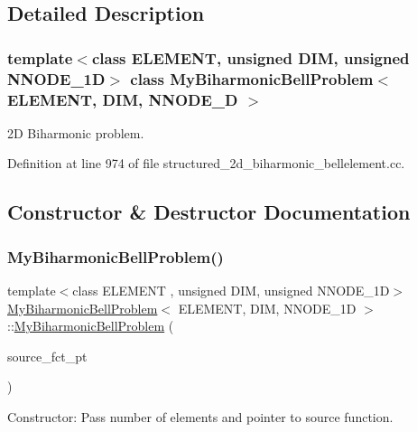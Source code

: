 \subsection{Detailed Description}
\subsubsection*{template$<$class E\+L\+E\+M\+E\+NT, unsigned D\+IM, unsigned N\+N\+O\+D\+E\+\_\+1D$>$\newline
class My\+Biharmonic\+Bell\+Problem$<$ E\+L\+E\+M\+E\+N\+T, D\+I\+M, N\+N\+O\+D\+E\+\_\+D $>$}

2D Biharmonic problem. 

Definition at line 974 of file structured\+\_\+2d\+\_\+biharmonic\+\_\+bellelement.\+cc.



\subsection{Constructor \& Destructor Documentation}
\mbox{\label{classMyBiharmonicBellProblem_a61b5ab7db1511188dd7ca00e01179dda}} 
\subsubsection{\texorpdfstring{My\+Biharmonic\+Bell\+Problem()}{MyBiharmonicBellProblem()}}
{\footnotesize\ttfamily template$<$class E\+L\+E\+M\+E\+NT , unsigned D\+IM, unsigned N\+N\+O\+D\+E\+\_\+1D$>$ \\
\hyperlink{classMyBiharmonicBellProblem}{My\+Biharmonic\+Bell\+Problem}$<$ E\+L\+E\+M\+E\+NT, D\+IM, N\+N\+O\+D\+E\+\_\+1D $>$\+::\hyperlink{classMyBiharmonicBellProblem}{My\+Biharmonic\+Bell\+Problem} (\begin{DoxyParamCaption}\item[{typename \hyperlink{classoomph_1_1MyBiharmonicEquations}{My\+Biharmonic\+Equations}$<$ D\+IM, N\+N\+O\+D\+E\+\_\+1D $>$\+::Source\+Fct\+Pt}]{source\+\_\+fct\+\_\+pt }\end{DoxyParamCaption})}



Constructor\+: Pass number of elements and pointer to source function. 

